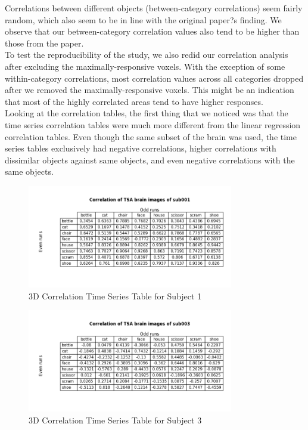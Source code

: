 \documentclass[11pt,twocolumn]{article}
\begin{document}
Correlations between different objects (between-category correlations) seem 
fairly random, which also seem to be in line with the original paper?s finding. 
We observe that our between-category correlation values also tend to be higher 
than those from the paper. \\

To test the reproducibility of the study, we also redid our correlation analysis 
after excluding the maximally-responsive voxels. With the exception of some 
within-category correlations, most correlation values across all categories dropped 
after we removed the maximally-responsive voxels. This might be an indication 
that most of the highly correlated areas tend to have higher responses. \\

Looking at the correlation tables, the first thing that we noticed was that
the time series correlation tables were much more different from the linear
regression correlation tables. Even though the same subset of the brain was 
used, the time series tables exclusively had negative correlations, higher 
correlations with dissimilar objects against same objects, and even negative
correlations with the same objects. \\

\begin{figure}[h!]                                                              
\centering                                                                      
\includegraphics[width=90mm]{subtracted_correlation_table_sub001.png}                   
\caption{3D Correlation Time Series Table for Subject 1}                                    
\end{figure}

\begin{figure}[h!]                                                              
\centering                                                                      
\includegraphics[width=90mm]{subtracted_correlation_table_sub003.png}                   
\caption{3D Correlation Time Series Table for Subject 3}                                    
\end{figure}
\end{document}
